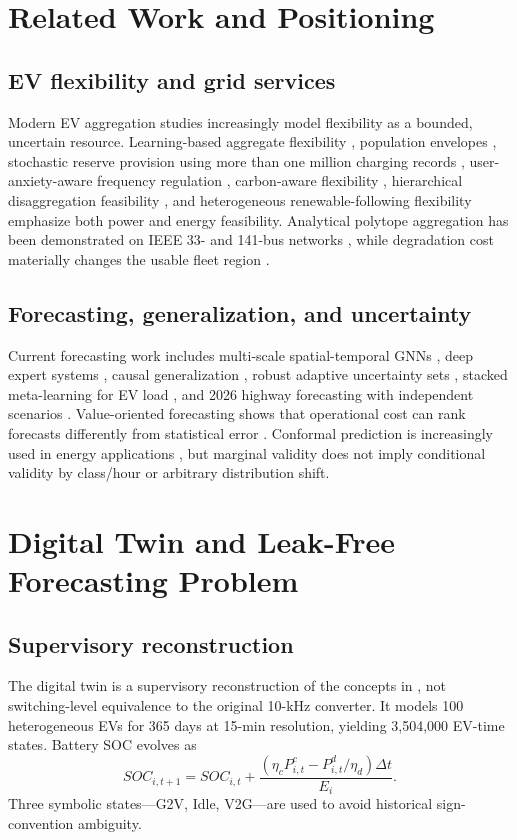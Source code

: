 \documentclass[journal]{IEEEtran}
\begin{document}
\section{Related Work and Positioning}
\subsection{EV flexibility and grid services}
Modern EV aggregation studies increasingly model flexibility as a bounded, uncertain resource. Learning-based aggregate flexibility \cite{r12}, population envelopes \cite{r17}, stochastic reserve provision using more than one million charging records \cite{r18}, user-anxiety-aware frequency regulation \cite{r26}, carbon-aware flexibility \cite{r27}, hierarchical disaggregation feasibility \cite{r28}, and heterogeneous renewable-following flexibility \cite{r29} emphasize both power and energy feasibility. Analytical polytope aggregation has been demonstrated on IEEE 33- and 141-bus networks \cite{r37}, while degradation cost materially changes the usable fleet region \cite{r38}.

\subsection{Forecasting, generalization, and uncertainty}
Current forecasting work includes multi-scale spatial-temporal GNNs \cite{r11}, deep expert systems \cite{r19}, causal generalization \cite{r22}, robust adaptive uncertainty sets \cite{r25}, stacked meta-learning for EV load \cite{r30}, and 2026 highway forecasting with independent scenarios \cite{r40}. Value-oriented forecasting shows that operational cost can rank forecasts differently from statistical error \cite{r20,r21}. Conformal prediction is increasingly used in energy applications \cite{r31,r32,r33,r34,r35}, but marginal validity does not imply conditional validity by class/hour or arbitrary distribution shift.

\section{Digital Twin and Leak-Free Forecasting Problem}
\subsection{Supervisory reconstruction}
The digital twin is a supervisory reconstruction of the concepts in \cite{r1}, not switching-level equivalence to the original 10-kHz converter. It models 100 heterogeneous EVs for 365 days at 15-min resolution, yielding 3,504,000 EV-time states. Battery SOC evolves as
\begin{equation}
SOC_{i,t+1}=SOC_{i,t}+\frac{(\eta_cP^c_{i,t}-P^d_{i,t}/\eta_d)\Delta t}{E_i}.
\end{equation}
Three symbolic states---G2V, Idle, V2G---are used to avoid historical sign-convention ambiguity.
\end{document}
